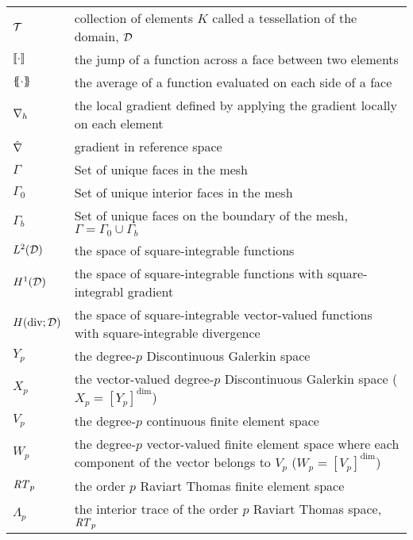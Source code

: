 \documentclass[../doc.tex]{subfiles}
\begin{document}
\begin{longtable}{p{2.25cm}p{12cm}}
$\mathcal{T}$ & collection of elements $K$ called a tessellation of the domain, $\mathcal{D}$ \\
$\left\llbracket\cdot \right\rrbracket$ & the jump of a function across a face between two elements \\
$\left\{\!\!\left\{\cdot\right\}\!\!\right\}$ & the average of a function evaluated on each side of a face \\
$\nabla_h$ & the local gradient defined by applying the gradient locally on each element \\ 
$\hat{\nabla}$ & gradient in reference space \\
$\Gamma$ & Set of unique faces in the mesh \\
$\Gamma_0$ & Set of unique interior faces in the mesh \\
$\Gamma_b$ & Set of unique faces on the boundary of the mesh, $\Gamma = \Gamma_0 \cup \Gamma_b$ \\
$L^2(\mathcal{D})$ & the space of square-integrable functions \\ 
$H^1(\mathcal{D})$ & the space of square-integrable functions with square-integrabl gradient \\ 
$H(\operatorname{div};\mathcal{D})$ & the space of square-integrable vector-valued functions with square-integrable divergence \\ 
$Y_p$ & the degree-$p$ Discontinuous Galerkin space \\
$X_p$ & the vector-valued degree-$p$ Discontinuous Galerkin space ($X_p = [Y_p]^{\dim}$)\\
$V_p$ & the degree-$p$ continuous finite element space \\ 
$W_p$ & the degree-$p$ vector-valued finite element space where each component of the vector belongs to $V_p$ ($W_p = [V_p]^{\dim}$) \\ 
$\mathit{RT}_p$ & the order $p$ Raviart Thomas finite element space \\ 
$\Lambda_p$ & the interior trace of the order $p$ Raviart Thomas space, $\mathit{RT}_p$ \\
\end{longtable}
\end{document}
